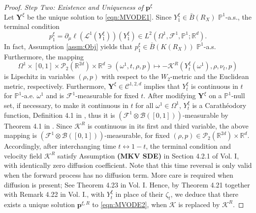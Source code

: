 \documentclass{article}
\newcommand{\R}{\mathbb{R}}
\begin{document}
\begin{appendices}
\begin{proof}
\textit{Step Two: Existence and Uniqueness of $\bm{p}^{\xi}$}\\
Let $\bm{Y}^{\xi}$ be the unique solution to \eqref{eqn:MVODE1}. Since $Y^{\xi}_1\in \bar B(R_X) $ $\mathbb P^1$-a.s., the terminal condition
\[
p_1^{\xi} = \partial_\mu\ell(\mathcal L^1(Y^{\xi}_1))(Y^{\xi}_1)\in L^2(\Omega^1,\mathcal F^1,\mathbb P^1;\R^d).
\]
 In fact, Assumption \ref{assm:Obj} yields that $p_1^\xi\in \bar B(K(R_X))$ $\mathbb P^1$-a.s. Furthermore, the mapping
 \[
 \Omega^1\times [0,1]\times \mathcal P_2(\R^{2d})\times \R^d\ni(\omega^1,t,\rho,p)\mapsto - \mathcal K^R(Y^{\xi}_t(\omega^1),\rho,\nu_t,p)
 \]
is Lipschitz in variables $(\rho,p)$ with respect to  the $W_2$-metric and the Euclidean metric, respectively. Furthermore, $\bm Y^\xi\in \mathscr{C}^{1,2,d}$ implies that $Y^\xi_t$ is continuous in $t$ for $\mathbb P^1$-a.e. $\omega^1$ and is $\mathcal F^1$-measurable for fixed $t$. After modifying $\bm Y^\xi$ on a $\mathbb P^1$-null set, if necessary, to make it continuous in $t$ for all $\omega^1\in\Omega^1$, $Y^\xi_t$ is a Carath\'eodory function, Definition 4.1 in \cite{AZHMYAKOV201987}, thus it is $(\mathcal F^1\otimes \mathcal B([0,1]))$-measurable by Theorem 4.1 in \cite{AZHMYAKOV201987}. Since $\mathcal K^R$ is continuous in its first and third variable, the above mapping is $(\mathcal F^1\otimes \mathcal B([0,1]))$-measurable, for fixed $(\rho,p)\in \mathcal P_2(\R^{2d})\times \R^d$.
 Accordingly, after interchanging time $t \leftrightarrow 1-t$, the terminal condition and velocity field $\mathcal K^R$ satisfy Assumption \textbf{(MKV SDE)} in Section 4.2.1 of \cite{carmona2018probabilistic} Vol. I, with identically zero diffusion coefficient.  Note that this time reversal is only valid when the forward process has no diffusion term. More care is required when diffusion is present; See Theorem 4.23 in \cite{carmona2018probabilistic} Vol. I. Hence, by Theorem 4.21 together with Remark 4.22 in \cite{carmona2018probabilistic} Vol. I., with $Y^\xi_t$ in place of their $\zeta_t$, we deduce that there exists a unique solution $\bm{p}^{\xi,R}$ to \eqref{eqn:MVODE2}, when $\mathcal K$ is replaced by $\mathcal K^R$. 


\end{proof}
\end{appendices}
\end{document}
